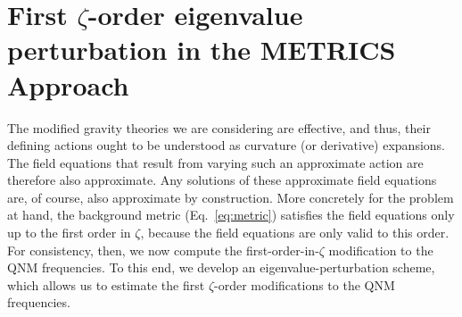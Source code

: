 \documentclass[aps,prx,amsmath,floats,floatfix,twocolumn,
  superscriptaddress,nofootinbib,showpacs]{revtex4-1}
\begin{document}
\section{First $\zeta$-order eigenvalue perturbation in the METRICS Approach}
\label{sec:eigenvalue_pert}

The modified gravity theories we are considering are effective, and thus, their defining actions ought to be understood as curvature (or derivative) expansions. The field equations that result from varying such an approximate action are therefore also approximate. Any solutions of these approximate field equations are, of course, also approximate by construction. More concretely for the problem at hand, the background metric (Eq.~\eqref{eq:metric}) satisfies the field equations only up to the first order in $\zeta$, because the field equations are only valid to this order. For consistency, then, we now compute the first-order-in-$\zeta$ modification to the QNM frequencies. 
To this end, we develop an eigenvalue-perturbation scheme, which allows us to estimate the first $\zeta$-order modifications to the QNM frequencies. 
\end{document}
